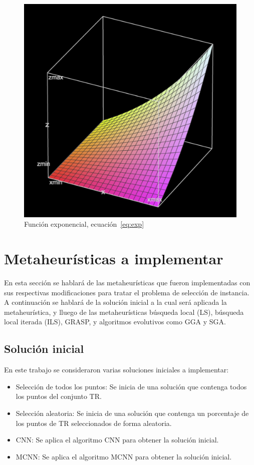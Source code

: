 \documentclass{ci5652}
\begin{document}
\begin{figure}[p]
    \centering
    \includegraphics[width=0.8\linewidth]{euler-3b}
    \caption{Función exponencial, ecuación~\ref{eq:exp}}
    \label{fig:euler3}
\end{figure}

\section{Metaheurísticas a implementar}
En esta sección se hablará de las metaheurísticas que fueron implementadas con sus respectivas modificaciones para tratar el problema de selección de instancia. A continuación se hablará de la solución inicial a la cual será aplicada la metaheurística, y lluego de las metaheurísticas búsqueda local (LS), búsqueda local iterada (ILS), GRASP, y algoritmos evolutivos como GGA y SGA.

\subsection{Solución inicial}

En este trabajo se consideraron varias soluciones iniciales a implementar:  
\begin{itemize}
\item Selección de todos los puntos: Se inicia de una solución que contenga todos los puntos del conjunto TR.
\item Selección aleatoria: Se inicia de una solución que contenga un porcentaje de los puntos de TR seleccionados de forma aleatoria.
\item CNN: Se aplica el algoritmo CNN para obtener la solución inicial.
\item MCNN: Se aplica el algoritmo MCNN para obtener la solución inicial.
\end{itemize}
\end{document}
